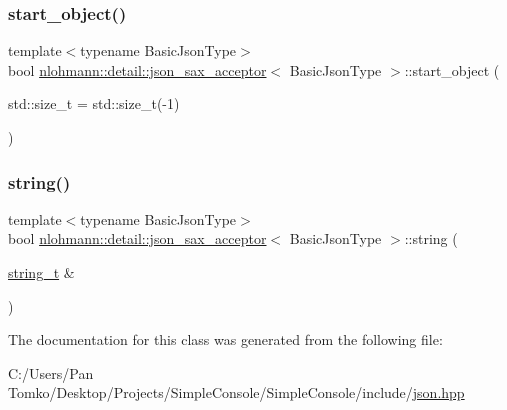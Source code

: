 \subsubsection{\texorpdfstring{start\_object()}{start\_object()}}
{\footnotesize\ttfamily template$<$typename Basic\+Json\+Type$>$ \\
bool \mbox{\hyperlink{classnlohmann_1_1detail_1_1json__sax__acceptor}{nlohmann\+::detail\+::json\+\_\+sax\+\_\+acceptor}}$<$ Basic\+Json\+Type $>$\+::start\+\_\+object (\begin{DoxyParamCaption}\item[{std\+::size\+\_\+t}]{ = {\ttfamily std\+:\+:size\+\_\+t(-\/1)} }\end{DoxyParamCaption})\hspace{0.3cm}{\ttfamily [inline]}}

\mbox{\label{classnlohmann_1_1detail_1_1json__sax__acceptor_aaa69255e757a6ecc4403a2aa4931fc60}} 
\subsubsection{\texorpdfstring{string()}{string()}}
{\footnotesize\ttfamily template$<$typename Basic\+Json\+Type$>$ \\
bool \mbox{\hyperlink{classnlohmann_1_1detail_1_1json__sax__acceptor}{nlohmann\+::detail\+::json\+\_\+sax\+\_\+acceptor}}$<$ Basic\+Json\+Type $>$\+::string (\begin{DoxyParamCaption}\item[{\mbox{\hyperlink{classnlohmann_1_1detail_1_1json__sax__acceptor_a3a8078bbf865ec355106f6048241609a}{string\+\_\+t}} \&}]{ }\end{DoxyParamCaption})\hspace{0.3cm}{\ttfamily [inline]}}



The documentation for this class was generated from the following file\+:\begin{DoxyCompactItemize}
\item 
C\+:/\+Users/\+Pan Tomko/\+Desktop/\+Projects/\+Simple\+Console/\+Simple\+Console/include/\mbox{\hyperlink{json_8hpp}{json.\+hpp}}\end{DoxyCompactItemize}

